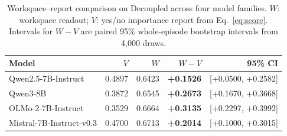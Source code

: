 \begin{table}[tbp]
\centering
\caption{Workspace--report comparison on Decoupled across four model families. $W$: workspace readout; $V$: yes/no importance report from Eq.~\eqref{eq:score}. Intervals for $W{-}V$ are paired 95\% whole-episode bootstrap intervals from 4,000 draws.}
\label{tab:crossfamily}
\small
\setlength{\tabcolsep}{4.5pt}
\begin{tabular}{lrrrr}
\toprule
Model & $V$ & $W$ & $W{-}V$ & 95\% CI \\
\midrule
Qwen2.5-7B-Instruct & 0.4897 & 0.6423 & \textbf{+0.1526} & [+0.0500, +0.2582] \\
Qwen3-8B & 0.3872 & 0.6545 & \textbf{+0.2673} & [+0.1670, +0.3668] \\
OLMo-2-7B-Instruct & 0.3529 & 0.6664 & \textbf{+0.3135} & [+0.2297, +0.3992] \\
Mistral-7B-Instruct-v0.3 & 0.4700 & 0.6713 & \textbf{+0.2014} & [+0.1000, +0.3015] \\
\bottomrule
\end{tabular}
\end{table}
